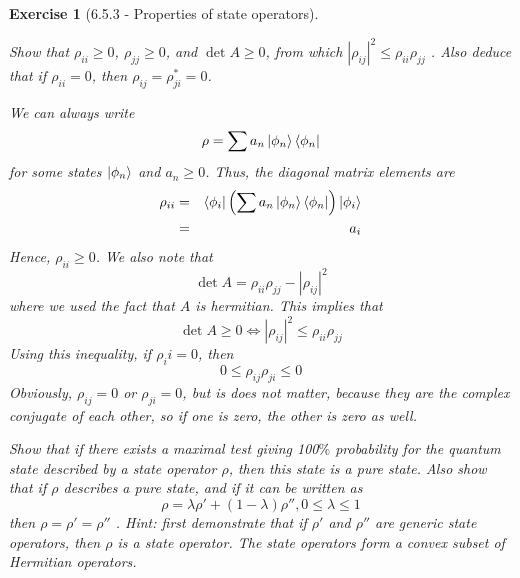 \documentclass[12pt]{article}
\def\be{\begin{equation}}
\def\ee{\end{equation}}
\def\bea{\begin{eqnarray*}}
\def\eea{\end{eqnarray*}}
\def\l{\left}
\def\r{\right}
\newtheorem{exercise}{Exercise}
\begin{document}
	\begin{exercise}[6.5.3 - Properties of state operators]
		\begin{exercises}
			\item Show that $\rho_{ii}\geq 0$, $\rho_{jj}\geq 0$, and $\det{A} \geq 0$, from which $|\rho_{ij}|^2 \leq \rho_{ii} \rho_{jj}$ . Also deduce that if $\rho_{ii} = 0$, then $\rho_{ij} = \rho_{ji}^* = 0$.
			\begin{multianswer}
				We can always write
				\be
					\rho = \sum a_n \ket{\phi_n}\bra{\phi_n}
				\ee
				for some states $\ket{\phi_n}$ and $a_n\geq 0$. Thus, the diagonal matrix elements are
				\bea
					\rho_{ii} &=& \bra{\phi_i} \l(\sum a_n \ket{\phi_n}\bra{\phi_n}\r) \ket{\phi_i} \\
						&=& a_i 
				\eea
				Hence, $\rho_{ii}\geq0$. We also note that
				\be
					\det{A} = \rho_{ii}\rho_{jj} - |\rho_{ij}|^2
				\ee
				where we used the fact that $A$ is hermitian. This implies that
				\be
					\det{A} \geq 0 \iff |\rho_{ij}|^2 \leq \rho_{ii}\rho_{jj}
				\ee
				Using this inequality, if $\rho_ii=0$, then
				\be
					0 \leq \rho_{ij}\rho_{ji} \leq 0
				\ee
				Obviously, $\rho_{ij}=0$ or $\rho_{ji}=0$, but is does not matter, because they are the complex conjugate of each other, so if one is zero, the other is zero as well.				
			\end{multianswer}
			
			\item Show that if there exists a maximal test giving 100$\%$ probability for the quantum state described
			by a state operator $\rho$, then this state is a pure state. Also show that if $\rho$ describes a pure state,
			and if it can be written as
			\be
				\rho = \lambda\rho' + (1 - \lambda)\rho'', 0 \leq \lambda 
				\leq 1
			\ee
			then $\rho=\rho'=\rho''$ . Hint: first demonstrate that if $\rho'$ and $\rho''$ are generic state operators, then $\rho$ is
			a state operator. The state operators form a convex subset of Hermitian operators.
			\begin{multianswer}[true]
				
			\end{multianswer}
			
		\end{exercises}
	\end{exercise}
	
\end{document}
